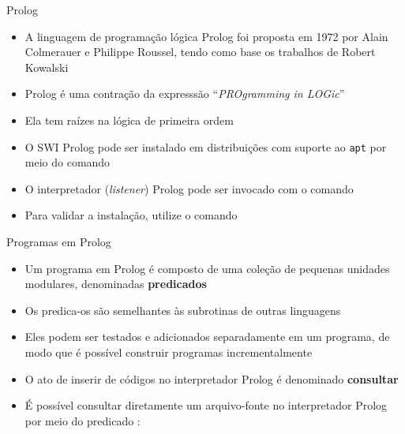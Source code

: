 \begin{frame}[fragile]{Prolog}

    \begin{itemize}
        \item A linguagem de programação lógica Prolog foi proposta em 1972 por 
           Alain Colmerauer e Philippe Roussel, tendo como base os trabalhos de Robert Kowalski 

        \item Prolog é uma contração da expresssão ``\textit{PROgramming in LOGic}''

        \item Ela tem raízes na lógica de primeira ordem

        \item O SWI Prolog pode ser instalado em distribuições com suporte ao
            \texttt{apt} por meio do comando


        \item O interpretador (\textit{listener}) Prolog pode ser invocado com o comando


        \item Para validar a instalação, utilize o comando

    \end{itemize}

\end{frame}

\begin{frame}[fragile]{Programas em Prolog}

    \begin{itemize}

        \item Um programa em Prolog é composto de uma coleção de pequenas unidades modulares, 
            denominadas \textbf{predicados}

        \item Os predica-os são semelhantes às subrotinas de outras linguagens

        \item Eles podem ser testados e adicionados separadamente em um programa, de modo que 
            é possível construir programas incrementalmente

        \item O ato de inserir de códigos no interpretador Prolog é denominado
            \textbf{consultar}

        \item É possível consultar diretamente um arquivo-fonte no interpretador Prolog por
            meio do predicado :


    \end{itemize}

\end{frame}


